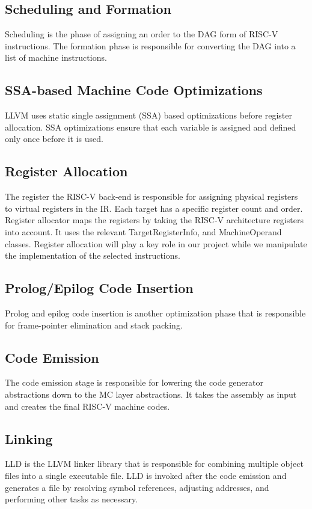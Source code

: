 \subsection{Scheduling and Formation}
Scheduling is the phase of assigning an order to the DAG form of RISC-V instructions. The formation phase is responsible for converting the DAG into a list of machine instructions.  

\subsection{SSA-based Machine Code Optimizations}
LLVM uses static single assignment (SSA) based optimizations before register allocation. SSA optimizations ensure that each variable is assigned and defined only once before it is used. 


\subsection{Register Allocation}
The register the RISC-V back-end is responsible for assigning physical registers to virtual registers in the IR. Each target has a specific register count and order. Register allocator maps the registers by taking the RISC-V architecture registers into account. It uses the relevant TargetRegisterInfo, and MachineOperand classes. Register allocation will play a key role in our project while we manipulate the implementation of the selected instructions.

\subsection{Prolog/Epilog Code Insertion}
Prolog and epilog code insertion is another optimization phase that is responsible for frame-pointer elimination and stack packing.

\subsection{Code Emission}
The code emission stage is responsible for lowering the code generator abstractions down to the MC layer abstractions. It takes the assembly as input and creates the final RISC-V machine codes. 

\subsection{Linking}
LLD is the LLVM linker library that is responsible for combining multiple object files into a single executable file. LLD is invoked after the code emission and generates a file by resolving symbol references, adjusting addresses, and performing other tasks as necessary.
